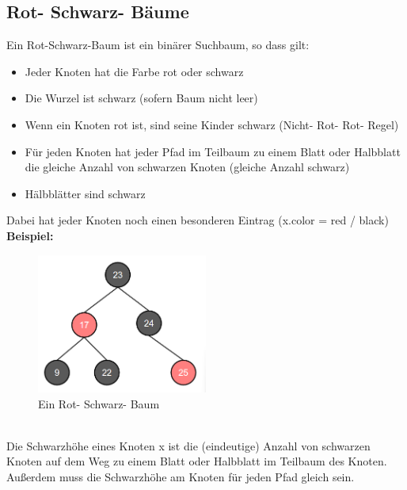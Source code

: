 \documentclass{article}
\begin{document}
        \subsection{Rot- Schwarz- Bäume}
            Ein Rot-Schwarz-Baum ist ein binärer Suchbaum, so dass gilt:
            \begin{itemize}
                \item Jeder Knoten hat die Farbe rot oder schwarz
                \item Die Wurzel ist schwarz (sofern Baum nicht leer)
                \item Wenn ein Knoten rot ist, sind seine Kinder schwarz (Nicht- Rot- Rot- Regel)
                \item Für jeden Knoten hat jeder Pfad im Teilbaum zu einem Blatt oder Halbblatt die gleiche Anzahl von schwarzen Knoten (gleiche Anzahl schwarz)
                \item Hälbblätter sind schwarz
            \end{itemize}
            Dabei hat jeder Knoten noch einen besonderen Eintrag (x.color = red / black)\\
            \textbf{Beispiel:} \\
            \begin{figure}[ht]
                \centering
                \includegraphics[width=0.5\textwidth]{Bilder/RSB.png}
                \caption{Ein Rot- Schwarz- Baum}
                \label{fig:RSB}
            \end{figure}\\
            Die Schwarzhöhe eines Knoten x ist die (eindeutige) Anzahl von schwarzen Knoten auf dem Weg zu einem Blatt oder Halbblatt im Teilbaum des Knoten. Außerdem muss die Schwarzhöhe am Knoten für jeden Pfad gleich sein.\\
\end{document}
